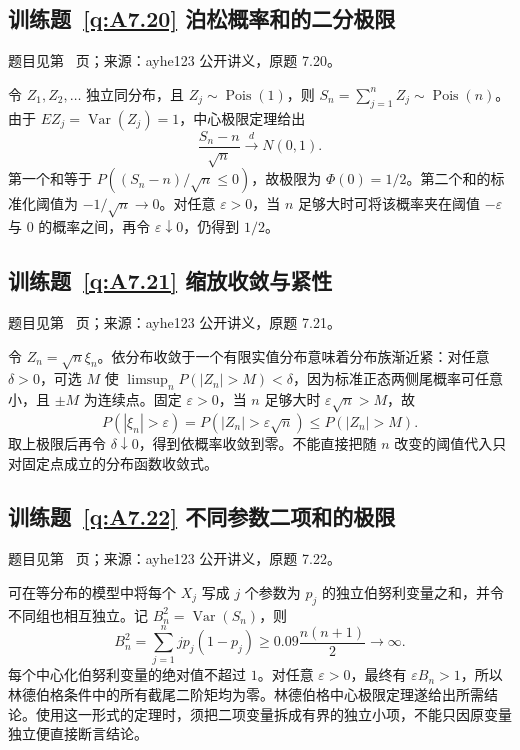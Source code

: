 \subsection*{训练题~\ref{q:A7.20} 泊松概率和的二分极限}\label{a:A7.20}{\small 题目见第~\pageref{q:A7.20} 页；来源：ayhe123 公开讲义，原题 7.20。}
\begin{solve}令 $Z_1,Z_2,\ldots$ 独立同分布，且 $Z_j\sim\operatorname{Pois}(1)$，则 $S_n=\sum_{j=1}^nZ_j\sim\operatorname{Pois}(n)$。由于 $EZ_j=\operatorname{Var}(Z_j)=1$，中心极限定理给出\[\frac{S_n-n}{\sqrt n}\xrightarrow{d}N(0,1).\]第一个和等于 $P((S_n-n)/\sqrt n\le0)$，故极限为 $\Phi(0)=1/2$。第二个和的标准化阈值为 $-1/\sqrt n\to0$。对任意 $\varepsilon>0$，当 $n$ 足够大时可将该概率夹在阈值 $-\varepsilon$ 与 $0$ 的概率之间，再令 $\varepsilon\downarrow0$，仍得到 $1/2$。\end{solve}

\subsection*{训练题~\ref{q:A7.21} 缩放收敛与紧性}\label{a:A7.21}{\small 题目见第~\pageref{q:A7.21} 页；来源：ayhe123 公开讲义，原题 7.21。}
\begin{solve}令 $Z_n=\sqrt n\xi_n$。依分布收敛于一个有限实值分布意味着分布族渐近紧：对任意 $\delta>0$，可选 $M$ 使 $\limsup_nP(|Z_n|>M)<\delta$，因为标准正态两侧尾概率可任意小，且 $\pm M$ 为连续点。固定 $\varepsilon>0$，当 $n$ 足够大时 $\varepsilon\sqrt n>M$，故\[P(|\xi_n|>\varepsilon)=P(|Z_n|>\varepsilon\sqrt n)\le P(|Z_n|>M).\]取上极限后再令 $\delta\downarrow0$，得到依概率收敛到零。不能直接把随 $n$ 改变的阈值代入只对固定点成立的分布函数收敛式。\end{solve}

\subsection*{训练题~\ref{q:A7.22} 不同参数二项和的极限}\label{a:A7.22}{\small 题目见第~\pageref{q:A7.22} 页；来源：ayhe123 公开讲义，原题 7.22。}
\begin{solve}可在等分布的模型中将每个 $X_j$ 写成 $j$ 个参数为 $p_j$ 的独立伯努利变量之和，并令不同组也相互独立。记 $B_n^2=\operatorname{Var}(S_n)$，则\[B_n^2=\sum_{j=1}^n jp_j(1-p_j)\ge0.09\frac{n(n+1)}2\longrightarrow\infty.\]每个中心化伯努利变量的绝对值不超过 $1$。对任意 $\varepsilon>0$，最终有 $\varepsilon B_n>1$，所以林德伯格条件中的所有截尾二阶矩均为零。林德伯格中心极限定理遂给出所需结论。使用这一形式的定理时，须把二项变量拆成有界的独立小项，不能只因原变量独立便直接断言结论。\end{solve}

